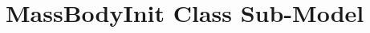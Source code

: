 %

\renewcommand\modelpartname{MassBodyInit Class Sub-Model}
\renewcommand\modelpartid{MassBodyInit}
\part{\modelpartname}\label{part:\modelpartid}






